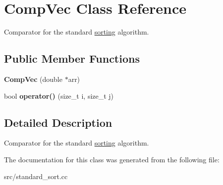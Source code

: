 \hypertarget{classCompVec}{
\section{CompVec Class Reference}
\label{d7/d1f/classCompVec}
}


Comparator for the standard \hyperlink{classsorting}{sorting} algorithm.  
\subsection*{Public Member Functions}
\begin{DoxyCompactItemize}
\item 
\hypertarget{classCompVec_a6963b86bb7b027c564f9fcbfa48631ff}{
{\bfseries CompVec} (double $\ast$arr)}
\label{d7/d1f/classCompVec_a6963b86bb7b027c564f9fcbfa48631ff}

\item 
\hypertarget{classCompVec_af72aba58e4ec029df30580c71c965490}{
bool {\bfseries operator()} (size\_\-t i, size\_\-t j)}
\label{d7/d1f/classCompVec_af72aba58e4ec029df30580c71c965490}

\end{DoxyCompactItemize}


\subsection{Detailed Description}
Comparator for the standard \hyperlink{classsorting}{sorting} algorithm. 

The documentation for this class was generated from the following file:\begin{DoxyCompactItemize}
\item 
src/standard\_\-sort.cc\end{DoxyCompactItemize}
